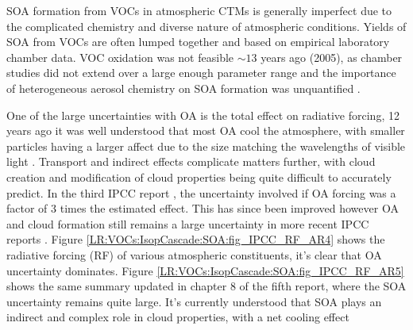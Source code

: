     SOA formation from VOCs in atmospheric CTMs is generally imperfect due to the complicated chemistry and diverse nature of atmospheric conditions.
    Yields of SOA from VOCs are often lumped together and based on empirical laboratory chamber data. 
    VOC oxidation was not feasible $\sim 13$ years ago (2005), as chamber studies did not extend over a large enough parameter range and the importance of heterogeneous aerosol chemistry on SOA formation was unquantified \citep{Kanakidou2005}.
    
    One of the large uncertainties with OA is the total effect on radiative forcing, 12 years ago it was well understood that most OA cool the atmosphere, with smaller particles having a larger affect due to the size matching the wavelengths of visible light \citep{Kanakidou2005}. 
    Transport and indirect effects complicate matters further, with cloud creation and modification of cloud properties being quite difficult to accurately predict.
    In the third IPCC report \citep{IPCC2001}, the uncertainty involved if OA forcing was a factor of 3 times the estimated effect. 
    This has since been improved however OA and cloud formation still remains a large uncertainty in more recent IPCC reports \citep{IPCC_Chapter2}.
    Figure \ref{LR:VOCs:IsopCascade:SOA:fig_IPCC_RF_AR4} shows the radiative forcing (RF) of various atmospheric constituents, it's clear that OA uncertainty dominates.
    Figure \ref{LR:VOCs:IsopCascade:SOA:fig_IPCC_RF_AR5} shows the same summary updated in chapter 8 of the fifth report, where the SOA uncertainty remains quite large.
    It's currently understood that SOA plays an indirect and complex role in cloud properties, with a net cooling effect \citep[Chapter 7,8]{IPCC_AR5_WG1}
    
